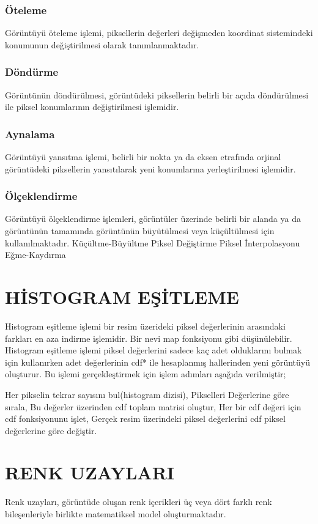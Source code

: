 \subsubsection{Öteleme}
Görüntüyü öteleme işlemi, piksellerin değerleri değişmeden koordinat sistemindeki konumunun değiştirilmesi olarak tanımlanmaktadır.
\subsubsection{Döndürme}
Görüntünün döndürülmesi, görüntüdeki piksellerin belirli bir açıda döndürülmesi ile piksel konumlarının değiştirilmesi işlemidir.
\subsubsection{Aynalama}
Görüntüyü yansıtma işlemi, belirli bir nokta ya da eksen etrafında orjinal görüntüdeki piksellerin yansıtılarak yeni konumlarına yerleştirilmesi işlemidir.
\subsubsection{Ölçeklendirme}
Görüntüyü ölçeklendirme işlemleri, görüntüler üzerinde belirli bir alanda ya da görüntünün tamamında görüntünün büyütülmesi veya küçültülmesi için kullanılmaktadır.
Küçültme-Büyültme
Piksel Değiştirme
Piksel İnterpolasyonu
Eğme-Kaydırma
\section{HİSTOGRAM EŞİTLEME}
\cite{platereg} Histogram eşitleme işlemi bir resim üzerideki piksel değerlerinin arasındaki farkları en aza indirme işlemidir. Bir nevi map fonksiyonu gibi düşünülebilir. Histogram eşitleme işlemi piksel değerlerini sadece kaç adet olduklarını bulmak için kullanırken adet değerlerinin cdf* ile hesaplanmış hallerinden yeni görüntüyü oluşturur.
Bu işlemi gerçekleştirmek için işlem adımları aşağıda verilmiştir;

Her pikselin tekrar sayısını bul(histogram dizisi),
Pikselleri Değerlerine göre sırala,
Bu değerler üzerinden cdf toplam matrisi oluştur,
Her bir cdf değeri için cdf fonksiyonunu işlet,
Gerçek resim üzerindeki piksel değerlerini cdf piksel değerlerine göre değiştir.
\section{RENK UZAYLARI}
\cite{imagep} Renk uzayları, görüntüde oluşan renk içerikleri üç veya dört farklı renk bileşenleriyle birlikte matematiksel model oluşturmaktadır.
